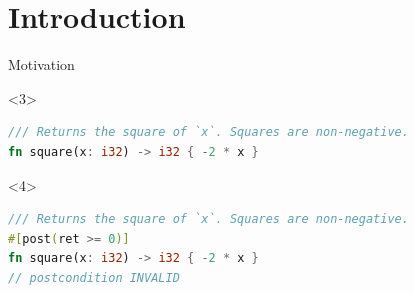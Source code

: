 \maketitle

\section{Introduction}

\begin{frame}[fragile]{Motivation}
\centering
{}


\begin{onlyenv}<3>
\begin{lstlisting}[style=short, language=Rust]
/// Returns the square of `x`. Squares are non-negative.
fn square(x: i32) -> i32 { -2 * x }
\end{lstlisting}
\end{onlyenv}

\begin{onlyenv}<4>
\begin{lstlisting}[style=short, language=Rust]
/// Returns the square of `x`. Squares are non-negative.
#[post(ret >= 0)]
fn square(x: i32) -> i32 { -2 * x }
// postcondition INVALID
\end{lstlisting}
\end{onlyenv}
\end{frame}


